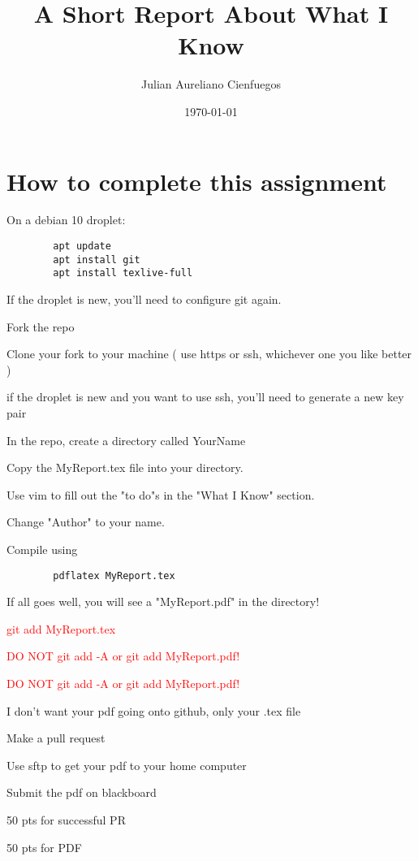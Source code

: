 \documentclass[11pt]{article}
\title{A Short Report About What I Know}
\author{ Julian Aureliano Cienfuegos }
\date{\today}
\begin{document}
\maketitle	

\section*{How to complete this assignment}
\begin{todolist}
    \item On a debian 10 droplet:
    \begin{verbatim}
        apt update
        apt install git
        apt install texlive-full
    \end{verbatim}
    \item If the droplet is new, you'll need to configure git again.
    \item Fork the repo
    \item Clone your fork to your machine ( use https or ssh, whichever one you like better )
    \item if the droplet is new and you want to use ssh, you'll need to generate a new key pair
    \item In the repo, create a directory called YourName
    \item Copy the MyReport.tex file into your directory.
    \item Use vim to fill out the "to do"s in the "What I Know" section.
    \item Change "Author" to your name.
    \item Compile using
    \begin{verbatim}
        pdflatex MyReport.tex
    \end{verbatim}
    \item If all goes well, you will see a "MyReport.pdf" in the directory!
    \item \textcolor{red}{ git add MyReport.tex}
    \item {\Large\textcolor{red}{ DO NOT git add -A or git add MyReport.pdf!}}
    \item {\LARGE\textcolor{red}{ DO NOT git add -A or git add MyReport.pdf!}}
    \item I don't want your pdf going onto github, only your .tex  file
    \item Make a pull request
    \item Use sftp to get your pdf to your home computer
    \item Submit the pdf on blackboard
    \item 50 pts for successful PR
    \item 50 pts for PDF
\end{todolist}
\end{document}
